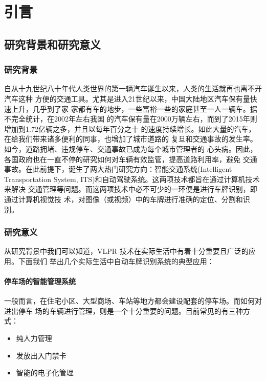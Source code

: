 \chapter{引言}
\section{研究背景和研究意义}
\subsection{研究背景}

自从十九世纪八十年代人类世界的第一辆汽车诞生以来，人类的生活就再也离不开汽车这种
方便的交通工具。尤其是进入21世纪以来，中国大陆地区汽车保有量快速上升，几乎到了家
家都有车的地步，一些富裕一些的家庭甚至一人一辆车。据不完全统计，在2002年左右我国
的汽车保有量在2000万辆左右，而到了2015年则增加到1.72亿辆之多，并且以每年百分之十
的速度持续增长。如此大量的汽车，在给我们带来诸多便利的同事，也增加了城市道路的
复旦和交通事故的发生率。如今，道路拥堵、违规停车、交通事故已成为每个城市管理者的
心头病。因此，各国政府也在一直不停的研究如何对车辆有效监管，提高道路利用率，避免
交通事故。在此前提下，诞生了两大热门研究方向：智能交通系统(Intelligent
Transportation System, ITS)和自动驾驶系统。这两项技术都旨在通过计算机技术来解决
交通管理等问题。而这两项技术中必不可少的一环便是进行车牌识别，即通过计算机视觉技
术，对图像（或视频）中的车牌进行准确的定位、分割和识别。

\subsection{研究意义}

从研究背景中我们可以知道，VLPR 技术在实际生活中有着十分重要且广泛的应用。下面我们
举出几个实际生活中自动车牌识别系统的典型应用：

\subsubsection{停车场的智能管理系统}

一般而言，在住宅小区、大型商场、车站等地方都会建设配套的停车场。而如何对进出停车
场的车辆进行管理，则是一个十分重要的问题。目前常见的有三种方式：

\begin{itemize}
\item 纯人力管理
\item 发放出入门禁卡
\item 智能的电子化管理
\end{itemize}

